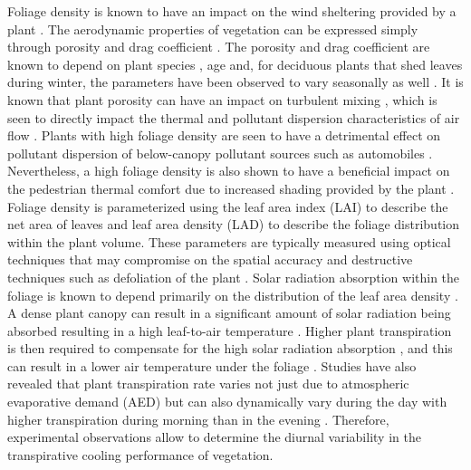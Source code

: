 Foliage density is known to have an impact on the wind sheltering provided by a plant \citep{Bitog2012b,Bitog2011b,Guan2003,Manickathan2018b}. The aerodynamic properties of vegetation can be expressed simply through porosity and drag coefficient \citep{Grant1998,Guan2003,Manickathan2018b}. The porosity and drag coefficient are known to depend on plant species \citep{Cao2012,Manickathan2018b,Rudnicki2004,Vollsinger2005}, age \citep{Dahle2010} and, for deciduous plants that shed leaves during winter, the parameters have been observed to vary seasonally as well \citep{Dellwik2019,Hwang2011,Maass1995}. It is known that plant porosity can have an impact on turbulent mixing \citep{Bai2012,Hiraoka2008,Manickathan2018b,McClure2017}, which is seen to directly impact the thermal and pollutant dispersion characteristics of air flow \citep{Conan2015,Gromke2008,Gromke2015c,Gromke2008a}. Plants with high foliage density are seen to have a detrimental effect on pollutant dispersion of below-canopy pollutant sources such as automobiles \citep{Nowak2006}. Nevertheless, a high foliage density is also shown to have a beneficial impact on the pedestrian thermal comfort due to increased shading provided by the plant \citep{Hwang2011,Morakinyo2017,Ng2012}. Foliage density is parameterized using the leaf area index (LAI) to describe the net area of leaves and leaf area density (LAD) to describe the foliage distribution within the plant volume. These parameters are typically measured using optical techniques \citep{Cao2012,Grant1998,Guan2003,Liu2018,Manickathan2018b,Phattaralerphong2005} that may compromise on the spatial accuracy and destructive techniques such as defoliation of the plant \citep{Jonckheere2004,ONeal2002}. Solar radiation absorption within the foliage is known to depend primarily on the distribution of the leaf area density \citep{Kichah2012,Manickathan2018a,Park2018}.  A dense plant canopy can result in a significant amount of solar radiation being absorbed resulting in a high leaf-to-air temperature \citep{Hiraoka2005,Leuzinger2007,Manickathan2018a}. Higher plant transpiration is then required to compensate for the high solar radiation absorption \citep{Manickathan2018b}, and this can result in a lower air temperature under the foliage \citep{Wong2003}. Studies have also revealed that plant transpiration rate varies not just due to atmospheric evaporative demand (AED) \citep{Kichah2012,Manickathan2018a,McVicar2012,Tuzet2003} but can also dynamically vary during the day with higher transpiration during morning than in the evening \citep{Huang2017,Tuzet2003}. Therefore, experimental observations allow to determine the diurnal variability in the transpirative cooling performance of vegetation.
	
